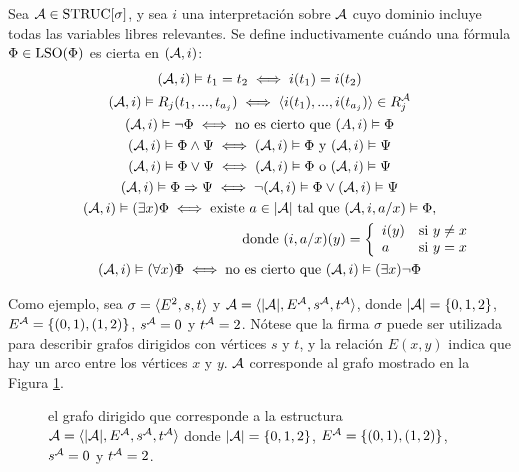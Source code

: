 \begin{definition}
\label{semantica_def}
Sea $\mathcal{A} \in \text{STRUC}[\sigma]$, y sea $i$ una interpretación sobre $\mathcal{A}$ cuyo
dominio incluye todas las variables libres relevantes. 
Se define inductivamente cuándo una fórmula 
$\Phi \in \text{LSO}(\Phi)$ es cierta en $(\mathcal{A}, i)$:
\begin{gather*}
(\A, i) \models t_1 = t_2 \iff i(t_1) = i(t_2)\\
(\A, i) \models R_j(t_1,...,t_{a_j}) \iff \tup{i(t_1),...,i(t_{a_j})} \in R_j^\A\\
(\A, i) \models \neg \Phi \iff \mbox{no es cierto que } (A, i) \models \Phi\\
(\A, i) \models \Phi \land \Psi \iff (\A, i) \models \Phi \mbox{ y } (\A, i) \models \Psi\\
(\A, i) \models \Phi \lor \Psi \iff (\A, i) \models \Phi \mbox{ o } (\A, i) \models \Psi\\
(\A, i) \models \Phi \Rightarrow \Psi \iff \neg(\A, i) \models \Phi \lor (\A, i) \models \Psi\\
(\A, i) \models (\exists x) \Phi \iff \mbox{existe } a \in |\A| 
\mbox{ tal que } (\A, i, a/x) \models \Phi,\\
\hspace{5cm} \mbox{donde } (i, a/x)(y) = \left\{
     \begin{array}{lr}
       i(y) & \mbox{si } y \not= x\\
       a & \mbox{si } y = x
     \end{array}
   \right.\\
(\A, i) \models (\forall x) \Phi \iff \mbox{no es cierto que } 
    (\A, i) \models (\exists x) \neg \Phi
\end{gather*}
\end{definition}

Como ejemplo, sea $\sigma=\langle E^2,s,t \rangle$ y
$\mathcal{A}=\langle |\mathcal{A}|,E^{\mathcal{A}},s^{\mathcal{A}},t^{\mathcal{A}} \rangle$, donde $|\mathcal{A}|=\{0,1,2\}$,
$E^{\mathcal{A}}=\{(0,1),(1,2)\}$, $s^{\mathcal{A}}=0$ y $t^{\mathcal{A}}=2$.
Nótese que la firma $\sigma$ puede ser utilizada para describir grafos
dirigidos con vértices $s$ y $t$, y la relación $E(x, y)$ indica que hay un
arco entre los vértices $x$ y $y$. $\mathcal{A}$ corresponde al grafo mostrado en la
Figura \ref{grafo_simple}.

\begin{figure}[h]
\begin{center}
\end{center}
\caption{el grafo dirigido que corresponde a la estructura $\mathcal{A}=\langle |\mathcal{A}|,E^{\mathcal{A}},s^{\mathcal{A}},t^{\mathcal{A}} \rangle$
donde $|\mathcal{A}|=\{0,1,2\}$, $E^{\mathcal{A}}=\{(0,1),(1,2)\}$, $s^{\mathcal{A}}=0$ y $t^{\mathcal{A}}=2$.}
\label{grafo_simple}
\end{figure}


